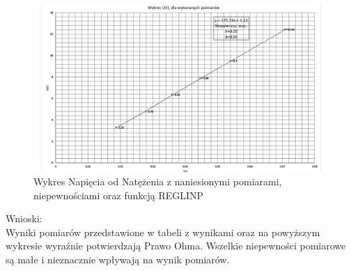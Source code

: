 \documentclass{article}
\begin{document}
\begin{figure}
    \includegraphics[width=\textwidth, angle=-90, scale=1.3]{new_graph.png}
    \caption{Wykres Napięcia od Natężenia z naniesionymi pomiarami, niepewnościami
     oraz funkcją REGLINP}
\end{figure}

Wnioski:\\
Wyniki pomiarów przedstawione w tabeli z wynikami oraz na powyższym wykresie 
wyraźnie potwierdzają Prawo Ohma. Wszelkie niepewności pomiarowe są małe i 
nieznacznie wpływają na wynik pomiarów. 
\end{document}
